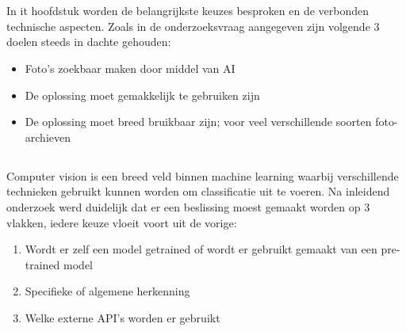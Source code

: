 
\chapter{}
\label{ch:methodologie}

\section{}
\label{sec:methodologie-inleiding}

In it hoofdstuk worden de belangrijkste keuzes besproken en de verbonden technische aspecten. Zoals in de onderzoeksvraag aangegeven zijn volgende 3 doelen steeds in dachte gehouden:
\begin{itemize}
    \item Foto's zoekbaar maken door middel van AI
    \item De oplossing moet gemakkelijk te gebruiken zijn
    \item De oplossing moet breed bruikbaar zijn; voor veel verschillende soorten foto-archieven
\end{itemize}

\section{}
\label{sec:keuze-van-computer-vision}
Computer vision is een breed veld binnen machine learning waarbij verschillende technieken gebruikt kunnen worden om classificatie uit te voeren. Na inleidend onderzoek werd duidelijk dat er een beslissing moest gemaakt worden op 3 vlakken, iedere keuze vloeit voort uit de vorige:
\begin{enumerate}
    \item Wordt er zelf een model getrained of wordt er gebruikt gemaakt van een pre-trained model
    \item Specifieke of algemene herkenning
    \item Welke externe API's worden er gebruikt
\end{enumerate}

